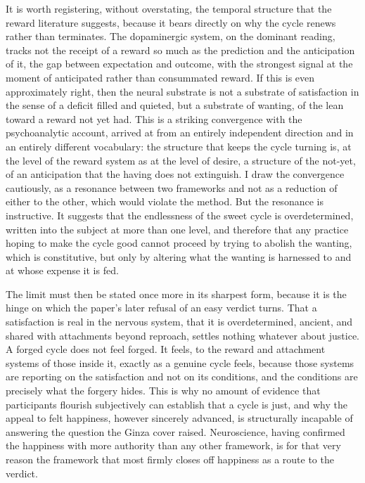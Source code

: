 \documentclass[11pt,a4paper]{article}
\begin{document}
It is worth registering, without overstating, the temporal structure that the reward literature suggests, because it bears directly on why the cycle renews rather than terminates. The dopaminergic system, on the dominant reading, tracks not the receipt of a reward so much as the prediction and the anticipation of it, the gap between expectation and outcome, with the strongest signal at the moment of anticipated rather than consummated reward. If this is even approximately right, then the neural substrate is not a substrate of satisfaction in the sense of a deficit filled and quieted, but a substrate of wanting, of the lean toward a reward not yet had. This is a striking convergence with the psychoanalytic account, arrived at from an entirely independent direction and in an entirely different vocabulary: the structure that keeps the cycle turning is, at the level of the reward system as at the level of desire, a structure of the not-yet, of an anticipation that the having does not extinguish. I draw the convergence cautiously, as a resonance between two frameworks and not as a reduction of either to the other, which would violate the method. But the resonance is instructive. It suggests that the endlessness of the sweet cycle is overdetermined, written into the subject at more than one level, and therefore that any practice hoping to make the cycle good cannot proceed by trying to abolish the wanting, which is constitutive, but only by altering what the wanting is harnessed to and at whose expense it is fed.

The limit must then be stated once more in its sharpest form, because it is the hinge on which the paper's later refusal of an easy verdict turns. That a satisfaction is real in the nervous system, that it is overdetermined, ancient, and shared with attachments beyond reproach, settles nothing whatever about justice. A forged cycle does not feel forged. It feels, to the reward and attachment systems of those inside it, exactly as a genuine cycle feels, because those systems are reporting on the satisfaction and not on its conditions, and the conditions are precisely what the forgery hides. This is why no amount of evidence that participants flourish subjectively can establish that a cycle is just, and why the appeal to felt happiness, however sincerely advanced, is structurally incapable of answering the question the Ginza cover raised. Neuroscience, having confirmed the happiness with more authority than any other framework, is for that very reason the framework that most firmly closes off happiness as a route to the verdict.
\end{document}
